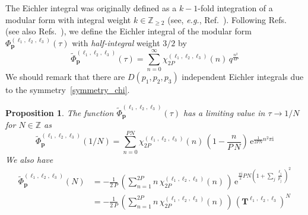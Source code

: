 \documentclass[12pt,reqno]{amsart}
\numberwithin{equation}{section}
\newtheorem{prop}[theorem]{Proposition}
\begin{document}
The Eichler integral was originally defined 
as a $k-1$-fold integration of  a modular form with integral
weight $k\in \mathbb{Z}_{\geq 2}$
(see, \emph{e.g.}, Ref.~).
Following Refs.~
(see also Refs.~), 
we define the Eichler integral of the modular form
$\Phi_{\boldsymbol{p}}^{(\ell_1,\ell_2,\ell_3)}(\tau)$ with \emph{half-integral}
weight $3/2$ by
\begin{equation}
  \widetilde{\Phi}_{\boldsymbol{p}}^{(\ell_1, \ell_2, \ell_3)}(\tau)
  =
  \sum_{n=0}^\infty
  \chi_{2 P}^{(\ell_1 , \ell_2, \ell_3)}(n) \,
  q^{\frac{n^2}{4 P}}
\end{equation}
We should remark that there are 
$D(p_1,p_2,p_3)$ independent Eichler integrals due to the
symmetry~\eqref{symmetry_chi}.



\begin{prop}
  \label{prop:Eichler_limit}
  The function
  $
  \widetilde{\Phi}_{\boldsymbol{p}}^{(\ell_1, \ell_2, \ell_3)}(\tau)
  $
  has a limiting value in $\tau \to 1/N$ for
   $N\in \mathbb{Z}$ as
  \begin{equation}
    \label{Eichler_fraction}
    \widetilde{\Phi}_{\boldsymbol{p}}^{(\ell_1, \ell_2, \ell_3)}(1/N)
    =
    \sum_{n=0}^{P N}
    \chi_{2 P}^{(\ell_1 , \ell_2, \ell_3)}(n) \,
    \left(
      1 - \frac{n}{P \, N}
    \right) \,
    \mathrm{e}^{\frac{1}{2 P N} n^2 \pi \mathrm{i}}
  \end{equation}
  We also have
  \begin{align}
    \label{Eichler_integer}
    \widetilde{\Phi}_{\boldsymbol{p}}^{(\ell_1, \ell_2, \ell_3)}(N)
    & =
    - \frac{1}{2 \, P} \,
    \left(
      \sum_{n=1}^{2 P}
      n \,
      \chi_{2 P}^{(\ell_1 , \ell_2, \ell_3)}(n) \,
    \right) \,
    \mathrm{e}^{\frac{\pi \mathrm{i}}{2} P N
      \left(
        1+\sum_j \frac{\ell_j}{p_j}
      \right)^2
    }
    \\
    & =
    - \frac{1}{2 \, P} \,
    \left(
      \sum_{n=1}^{2 P}
      n \,
      \chi_{2 P}^{(\ell_1 , \ell_2, \ell_3)}(n) \,
    \right) \,
    \left(
      \mathbf{T}^{\ell_1 , \ell_2, \ell_3}
    \right)^N
    \nonumber
  \end{align}
\end{prop}
\end{document}
